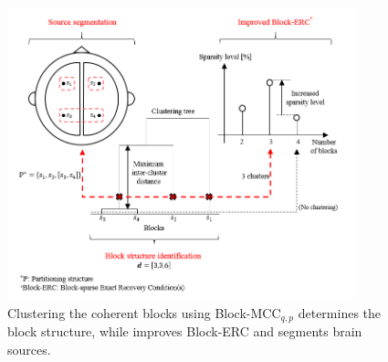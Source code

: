 \begin{figure}[!b]
\centering
\includegraphics[width=0.9\textwidth,keepaspectratio]{images/Leadfield_clustering_aimes.png} %
\centering
\caption{Clustering the coherent blocks using Block-MCC$_{q,p}$ determines the block structure, while improves Block-ERC and segments brain sources.}
\label{fig:Leadfield_clustering_aimes}
\end{figure}